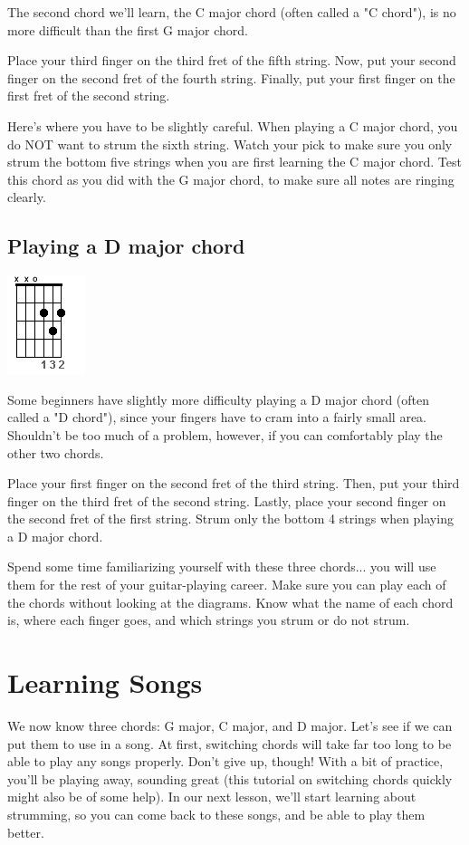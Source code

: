 The second chord we'll learn, the C major chord (often called a "C chord"), is
no more difficult than the first G major chord.

Place your third finger on the third fret of the fifth string. Now, put your
second finger on the second fret of the fourth string. Finally, put your first
finger on the first fret of the second string.

Here's where you have to be slightly careful. When playing a C major chord, you
do NOT want to strum the sixth string. Watch your pick to make sure you only
strum the bottom five strings when you are first learning the C major chord.
Test this chord as you did with the G major chord, to make sure all notes are
ringing clearly. 

\subsection{Playing a D major chord}
\includegraphics{partone/opendmajor.png}

Some beginners have slightly more difficulty playing a D major chord (often
called a "D chord"), since your fingers have to cram into a fairly small area.
Shouldn't be too much of a problem, however, if you can comfortably play the
other two chords.

Place your first finger on the second fret of the third string. Then, put your
third finger on the third fret of the second string. Lastly, place your second
finger on the second fret of the first string. Strum only the bottom 4 strings
when playing a D major chord.

Spend some time familiarizing yourself with these three chords... you will use
them for the rest of your guitar-playing career. Make sure you can play each of
the chords without looking at the diagrams. Know what the name of each chord
is, where each finger goes, and which strings you strum or do not strum. 

\section{Learning Songs}
We now know three chords: G major, C major, and D major. Let's see if we can
put them to use in a song. At first, switching chords will take far too long to
be able to play any songs properly. Don't give up, though! With a bit of
practice, you'll be playing away, sounding great (this tutorial on switching
chords quickly might also be of some help). In our next lesson, we'll start
learning about strumming, so you can come back to these songs, and be able to
play them better.

